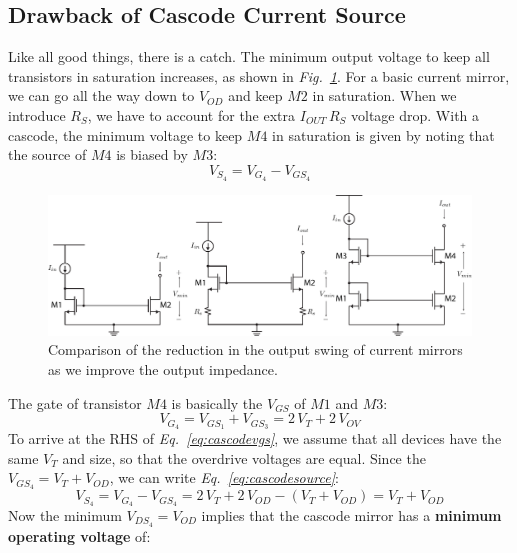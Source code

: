 \subsection{Drawback of Cascode Current Source}
Like all good things, there is a catch.  The minimum output voltage to keep all transistors in saturation increases, as shown in \emph{Fig.~\ref{fig:mirrors_vmin}}.  For a basic current mirror, we can go all the way down to $V_{OD}$ and keep $M2$ in saturation.  When we introduce $R_S$, we have to account for the extra $I_{OUT}\,R_S$ voltage drop.  With a cascode, the minimum voltage to keep $M4$ in saturation is given by noting that the source of $M4$ is biased by $M3$:
    \begin{equation}
        V_{S_4} = V_{G_4} - V_{GS_4}
        \label{eq:cascodesource}
    \end{equation}
\begin{figure}[H]
\centering
\includegraphics[width=\columnwidth]{mirrors_vmin}
\caption{Comparison of the reduction in the output swing of current mirrors as we improve the output impedance.}
\label{fig:mirrors_vmin}
\end{figure}
The gate of transistor $M4$ is basically the $V_{GS}$ of $M1$ and $M3$:
    \begin{equation}
        V_{G_4} = V_{GS_1} + V_{GS_3} = 2\,V_T + 2\,V_{OV}
        \label{eq:cascodevgs}
    \end{equation}
To arrive at the RHS of \emph{Eq.~\ref{eq:cascodevgs}}, we assume that all devices have the same $V_T$ and size, so that the overdrive voltages are equal.  Since the $V_{GS_4} = V_T + V_{OD}$, we can write \emph{Eq.~\ref{eq:cascodesource}}:
    \begin{equation}
        V_{S_4} = V_{G_4} - V_{GS_4}   = 2\,V_T + 2\,V_{OD} - (V_T + V_{OD}) = V_T + V_{OD}
    \end{equation}
Now the minimum $V_{DS_4} = V_{OD}$ implies that the cascode mirror has a \textbf{minimum operating voltage} of:
